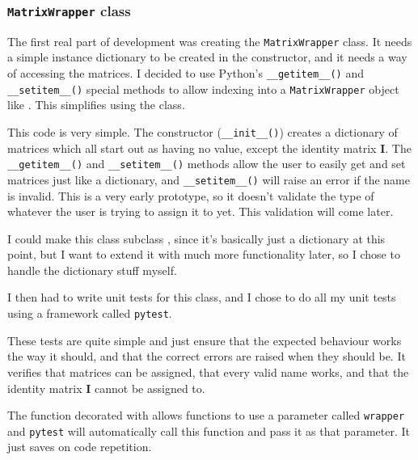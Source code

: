 \documentclass[../development.tex]{subfiles}
\begin{document}
\subsubsection{\texttt{MatrixWrapper} class\label{development:matrices-backend:MatrixWrapper-class}}

The first real part of development was creating the \texttt{MatrixWrapper} class. It needs a simple instance dictionary to be created in the constructor, and it needs a way of accessing the matrices. I decided to use Python's \texttt{__getitem__()} and \texttt{__setitem__()} special methods\cite{python-3-special-methods} to allow indexing into a \texttt{MatrixWrapper} object like . This simplifies using the class.


This code is very simple. The constructor (\texttt{__init__()}) creates a dictionary of matrices which all start out as having no value, except the identity matrix \textbf{I}. The \texttt{__getitem__()} and \texttt{__setitem__()} methods allow the user to easily get and set matrices just like a dictionary, and \texttt{__setitem__()} will raise an error if the name is invalid. This is a very early prototype, so it doesn't validate the type of whatever the user is trying to assign it to yet. This validation will come later.

I could make this class subclass , since it's basically just a dictionary at this point, but I want to extend it with much more functionality later, so I chose to handle the dictionary stuff myself.

I then had to write unit tests for this class, and I chose to do all my unit tests using a framework called \texttt{pytest}.



These tests are quite simple and just ensure that the expected behaviour works the way it should, and that the correct errors are raised when they should be. It verifies that matrices can be assigned, that every valid name works, and that the identity matrix \textbf{I} cannot be assigned to.

The function decorated with  allows functions to use a parameter called \texttt{wrapper} and \texttt{pytest} will automatically call this function and pass it as that parameter. It just saves on code repetition.
\end{document}
